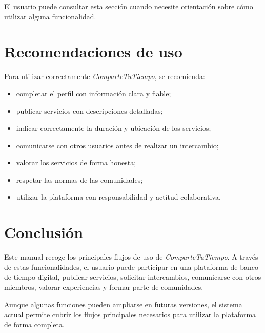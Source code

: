 El usuario puede consultar esta sección cuando necesite orientación sobre cómo utilizar alguna funcionalidad.

\section{Recomendaciones de uso}

Para utilizar correctamente \textit{ComparteTuTiempo}, se recomienda:

\begin{itemize}
    \item completar el perfil con información clara y fiable;
    \item publicar servicios con descripciones detalladas;
    \item indicar correctamente la duración y ubicación de los servicios;
    \item comunicarse con otros usuarios antes de realizar un intercambio;
    \item valorar los servicios de forma honesta;
    \item respetar las normas de las comunidades;
    \item utilizar la plataforma con responsabilidad y actitud colaborativa.
\end{itemize}

\section{Conclusión}

Este manual recoge los principales flujos de uso de \textit{ComparteTuTiempo}. A través de estas funcionalidades, el usuario puede participar en una plataforma de banco de tiempo digital, publicar servicios, solicitar intercambios, comunicarse con otros miembros, valorar experiencias y formar parte de comunidades.

Aunque algunas funciones pueden ampliarse en futuras versiones, el sistema actual permite cubrir los flujos principales necesarios para utilizar la plataforma de forma completa.
